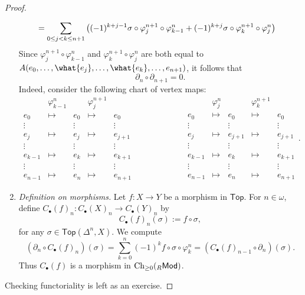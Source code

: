 \begin{proof}
\begin{enumerate}[label = \textit{Step \arabic*:},wide = 0pt]
\begin{align*}
				&= \sum_{0 \leq j < k \leq n + 1}\del[1]{(-1)^{k + j - 1} \sigma \circ \varphi^{n + 1}_j \circ \varphi^n_{k - 1} + (-1)^{k + j} \sigma \circ \varphi^{n + 1}_k \circ \varphi^n_j}
			\end{align*}
			Since $\varphi_j^{n + 1} \circ \varphi_{k - 1}^n$ and $\varphi_k^{n + 1} \circ \varphi_j^n$ are both equal to $A(e_0,\dots,\what{e_j},\dots,\what{e_k},\dots,e_{n + 1})$, it follows that
			\begin{equation*}
				\partial_n \circ \partial_{n + 1} = 0.
			\end{equation*}
			Indeed, consider the following chart of vertex maps:
			\begin{equation*}
				\begin{matrix}
					& \varphi_{k - 1}^n & & \varphi_j^{n + 1}\\
					e_0 & \mapsto & e_0 & \mapsto & e_0\\
					\vdots & & \vdots & & \vdots\\
					e_j & \mapsto & e_j & \mapsto & e_{j + 1}\\
					\vdots & & \vdots & & \vdots\\
					e_{k - 1} & \mapsto & e_k & \mapsto & e_{k + 1}\\
					\vdots & & \vdots & & \vdots\\
					e_{n - 1} & \mapsto & e_n & \mapsto & e_{n + 1}
				\end{matrix}
				\qquad\qquad\qquad
				\begin{matrix}
					& \varphi_j^n & & \varphi_k^{n + 1}\\
					e_0 & \mapsto & e_0 & \mapsto & e_0\\
					\vdots & & \vdots & & \vdots\\
					e_j & \mapsto & e_{j + 1} & \mapsto & e_{j + 1}\\
					\vdots & & \vdots & & \vdots\\
					e_{k - 1} & \mapsto & e_k & \mapsto & e_{k + 1}\\
					\vdots & & \vdots & & \vdots\\
					e_{n - 1} & \mapsto & e_n & \mapsto & e_{n + 1}
				\end{matrix}.
			\end{equation*}
		\item \textit{Definition on morphisms.} Let $f : X \to Y$ be a morphism in $\mathsf{Top}$. For $n \in \omega$, define $C_\bullet(f)_n : C_\bullet(X)_n \to C_\bullet(Y)_n$ by
			\begin{equation*}
				C_\bullet(f)_n(\sigma) := f \circ \sigma,
			\end{equation*}
			\noindent for any $\sigma \in \mathsf{Top}(\Delta^n,X)$. We compute 
			\begin{equation*}
				(\partial_n \circ C_\bullet(f)_n)(\sigma) = \sum_{k = 0}^n (-1)^k f \circ \sigma \circ \varphi^n_k = (C_\bullet(f)_{n - 1}\circ \partial_n)(\sigma).
			\end{equation*}
			\noindent Thus $C_\bullet(f)$ is a morphism in $\operatorname{Ch}_{\geq 0}({_R}\mathsf{Mod})$.
	\end{enumerate}
	Checking functoriality is left as an exercise.
\end{proof}


